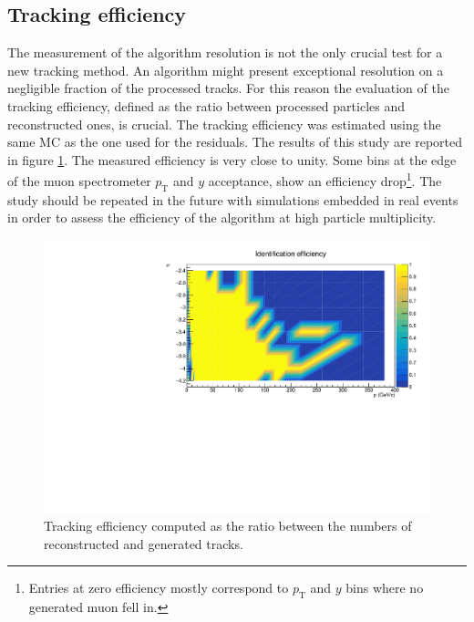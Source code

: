 \subsection{Tracking efficiency}
The measurement of the algorithm resolution is not the only crucial test for a new tracking method.
An algorithm might present exceptional resolution on a negligible fraction of the processed tracks.
For this reason the evaluation of the tracking efficiency, defined as the ratio between processed particles and reconstructed ones, is crucial.
The tracking efficiency was estimated using the same MC as the one used for the residuals. 
The results of this study are reported in figure \ref{fig:ID_eff}.
The measured efficiency is very close to unity.
Some bins at the edge of the muon spectrometer $p_{\mathrm{T}}$ and $y$ acceptance, show an efficiency drop\footnote{Entries at zero efficiency mostly correspond to $p_{\mathrm{T}}$ and $y$ bins where no generated muon fell in.}.
The study should be repeated in the future with simulations embedded in real events in order to assess the efficiency of the algorithm at high particle multiplicity.

\begin{figure}[!b]
\begin{center}
\includegraphics[width=0.9\linewidth]{Chapters/O2/Figs/ID_Eff.pdf}
\caption{Tracking efficiency computed as the ratio between the numbers of reconstructed and generated tracks.}
\label{fig:ID_eff}
\end{center}
\end{figure}

